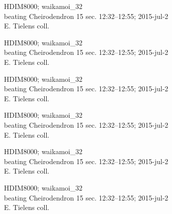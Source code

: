 \documentclass[2pt]{extarticle}
\begin{document}
\noindent
\parbox{0.16\textwidth}{\tiny \raggedright \rule[-0.3\baselineskip]{0pt}{10pt}HDIM8000; waikamoi\_32\\ beating Cheirodendron 15 sec. 12:32--12:55; 2015-jul-2\\ E. Tielens coll.}
\parbox{0.16\textwidth}{\tiny \raggedright \rule[-0.3\baselineskip]{0pt}{10pt}HDIM8000; waikamoi\_32\\ beating Cheirodendron 15 sec. 12:32--12:55; 2015-jul-2\\ E. Tielens coll.}
\parbox{0.16\textwidth}{\tiny \raggedright \rule[-0.3\baselineskip]{0pt}{10pt}HDIM8000; waikamoi\_32\\ beating Cheirodendron 15 sec. 12:32--12:55; 2015-jul-2\\ E. Tielens coll.}
\parbox{0.16\textwidth}{\tiny \raggedright \rule[-0.3\baselineskip]{0pt}{10pt}HDIM8000; waikamoi\_32\\ beating Cheirodendron 15 sec. 12:32--12:55; 2015-jul-2\\ E. Tielens coll.}
\parbox{0.16\textwidth}{\tiny \raggedright \rule[-0.3\baselineskip]{0pt}{10pt}HDIM8000; waikamoi\_32\\ beating Cheirodendron 15 sec. 12:32--12:55; 2015-jul-2\\ E. Tielens coll.}
\parbox{0.16\textwidth}{\tiny \raggedright \rule[-0.3\baselineskip]{0pt}{10pt}HDIM8000; waikamoi\_32\\ beating Cheirodendron 15 sec. 12:32--12:55; 2015-jul-2\\ E. Tielens coll.} \\ 
\vspace{0.001in} 
\end{document}
